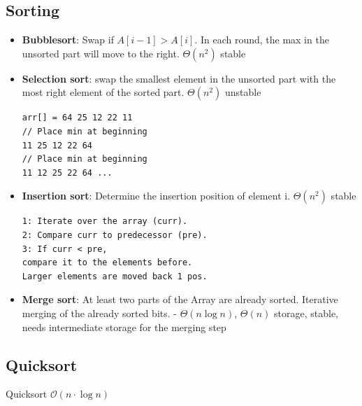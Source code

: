 \documentclass[9pt,landscape,a4paper, table]{extarticle}
\begin{document}
\begin{multicols*}{3}
\section{Sorting}

\begin{itemize}
    \item \textbf{Bubblesort}: Swap if $A[i-1]> A[i]$. In each round, the max in the unsorted part will move to the right. $\Theta(n^2)$ stable
    \item \textbf{Selection sort}: swap the smallest element in the unsorted part with the most right element of the sorted part. $\Theta(n^2)$ unstable
    
    \begin{verbatim}
arr[] = 64 25 12 22 11
// Place min at beginning
11 25 12 22 64
// Place min at beginning
11 12 25 22 64 ...
    \end{verbatim}
    
    \item \textbf{Insertion sort}: Determine the insertion position of element i. $\Theta(n^2)$ stable
    
\begin{verbatim}
1: Iterate over the array (curr).
2: Compare curr to predecessor (pre).
3: If curr < pre,
compare it to the elements before.
Larger elements are moved back 1 pos.
\end{verbatim}
    \item \textbf{Merge sort}: At least two parts of the Array are already sorted. Iterative merging of the already sorted bits. - $\Theta(n \log n)$,  $\Theta(n)$ storage, stable,  needs intermediate storage for the merging step
\end{itemize}
\subsection{Quicksort}
{\scriptsize
\begin{algorithm}[H]
    \caption{Quicksort $\mathcal{O}(n\cdot \log n)$}
    
    \SetAlgoLined
\end{algorithm}}


\end{multicols*}
\end{document}
